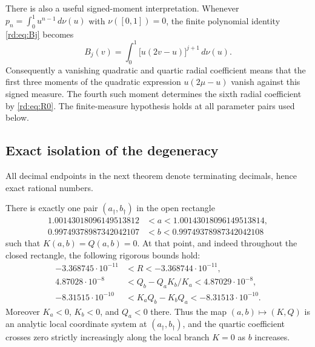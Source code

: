There is also a useful signed-moment interpretation. Whenever
$p_n=\int_0^1u^{n-1}\,d\nu(u)$ with $\nu([0,1])=0$,
the finite polynomial identity \eqref{rd:eq:Bj} becomes
\begin{equation}\label{rd:eq:momentBj}
 B_j(v)=\int_0^1\bigl[u(2v-u)\bigr]^{j+1}\,d\nu(u).
\end{equation}
Consequently a vanishing quadratic and quartic radial coefficient means
that the first three moments of the quadratic expression
$u(2\mu-u)$ vanish against this signed measure. The fourth such moment
determines the sixth radial coefficient by \eqref{rd:eq:R0}. The
finite-measure hypothesis holds at all parameter pairs used below.

\subsection{Exact isolation of the degeneracy}

All decimal endpoints in the next theorem denote terminating decimals,
hence exact rational numbers.

\begin{theorem}
\label{rd:thm:certificate}
There is exactly one pair $(a_\dagger,b_\dagger)$ in the open rectangle
\begin{align}
 1.00143018096149513812&<a<1.00143018096149513814,
 \label{rd:eq:abox}\\
 0.99749378987342042107&<b<0.99749378987342042108
 \label{rd:eq:bbox}
\end{align}
such that $K(a,b)=Q(a,b)=0$. At that point, and indeed throughout the
closed rectangle, the following rigorous bounds hold:
\begin{align}
 -3.368745\cdot10^{-11}&<R<-3.368744\cdot10^{-11},\label{rd:eq:Rbound}\\
 4.87028\cdot10^{-8}
  &<Q_b-Q_aK_b/K_a<4.87029\cdot10^{-8},\label{rd:eq:qprimebound}\\
 -8.31515\cdot10^{-10}
  &<K_aQ_b-K_bQ_a<-8.31513\cdot10^{-10}.
 \label{rd:eq:Jbound}
\end{align}
Moreover $K_a<0$, $K_b<0$, and $Q_a<0$ there. Thus the map
$(a,b)\mapsto(K,Q)$ is an analytic local coordinate system at
$(a_\dagger,b_\dagger)$, and the quartic coefficient crosses zero
strictly increasingly along the local branch $K=0$ as $b$ increases.
\end{theorem}

